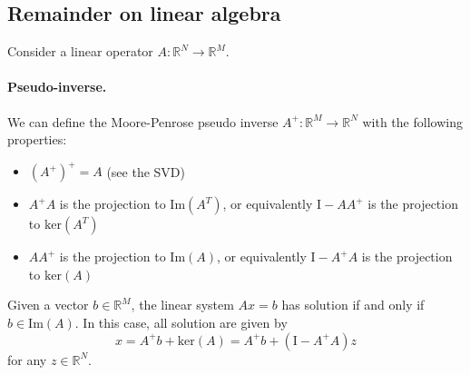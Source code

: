 \documentclass[a4paper,10pt]{article}
\theoremstyle{definition} %
\theoremstyle{definition} %
\newtheorem{proposition}[definition]{Proposition}
\theoremstyle{definition} %
\theoremstyle{definition} %
\newcommand{\R}{\mathbb{R}}
\renewcommand{\ker}[1]{\mathrm{ker}\left( {#1} \right)}
\newcommand{\Id}{\mathrm{I}}
\newcommand{\0}{\boldsymbol{0}}
\begin{document}
\subsection{Remainder on linear algebra}
    Consider a linear operator $A: \R^N \to \R^M$.
    \paragraph{Pseudo-inverse.} We can define the Moore-Penrose pseudo inverse $A^+:\R^M \to \R^N$ with the following properties:
    \begin{itemize}
        \item[] $(A^+)^+ = A$ (see the SVD)
        \item[] $A^+ A$ is the projection to $\mathrm{Im}(A^T)$, or equivalently $\Id - A A^+$ is the projection to $\ker{A^T}$
        \item[] $A A^+$ is the projection to $\mathrm{Im}(A)$, or equivalently $\Id - A^+ A$ is the projection to $\ker{A}$
    \end{itemize}
    Given a vector $b \in \R^M$, the linear system $Ax = b$ has solution if and only if $b \in \mathrm{Im}(A)$. In this case, all solution are given by 
    \begin{equation*}
        x = A^+b + \ker{A} = A^+b + \left( \Id - A^+ A \right) z 
    \end{equation*}
    for any $z \in \R^N$.

      
\end{document}
